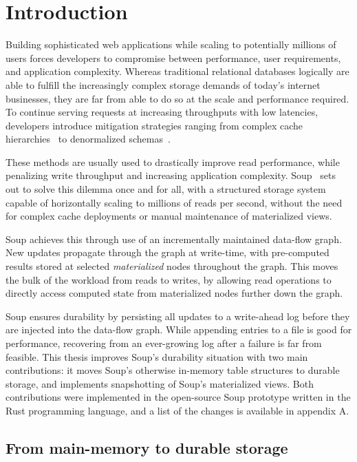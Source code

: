 

\chapter{Introduction}

Building sophisticated web applications while scaling to potentially millions of
users forces developers to compromise between performance, user requirements,
and application complexity. Whereas traditional relational databases logically
are able to fulfill the increasingly complex storage demands of today's internet
businesses, they are far from able to do so at the scale and performance
required. To continue serving requests at increasing throughputs with low
latencies, developers introduce mitigation strategies ranging from complex cache
hierarchies~\cite{memcached} to denormalized schemas~\cite{denormalization}.

These methods are usually used to drastically improve read performance, while
penalizing write throughput and increasing application complexity.
Soup~\cite{xylem} sets out to solve this dilemma once and for all, with a
structured storage system capable of horizontally scaling to millions of reads
per second, without the need for complex cache deployments or manual maintenance
of materialized views.

Soup achieves this through use of an incrementally maintained data-flow graph.
New updates propagate through the graph at write-time, with pre-computed results
stored at selected \textit{materialized} nodes throughout the graph. This
moves the bulk of the workload from reads to writes, by allowing read operations
to directly access computed state from materialized nodes further down the
graph.

Soup ensures durability by persisting all updates to a write-ahead log before
they are injected into the data-flow graph. While appending entries to a file is
good for performance, recovering from an ever-growing log after a failure is far
from feasible. This thesis improves Soup's durability situation with two main
contributions: it moves Soup's otherwise in-memory table structures to durable
storage, and implements snapshotting of Soup's materialized views. Both
contributions were implemented in the open-source Soup prototype written in the
Rust programming language, and a list of the changes is available in appendix A.

\newpage

\section{From main-memory to durable storage}

